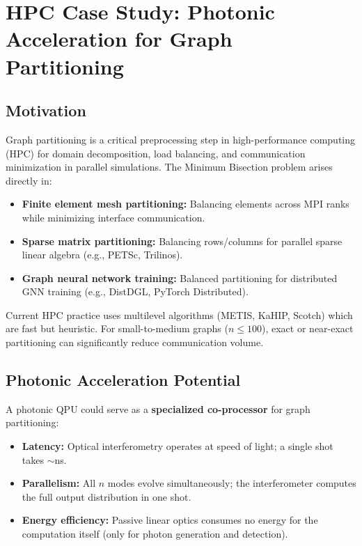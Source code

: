 \section{HPC Case Study: Photonic Acceleration for Graph Partitioning}
\label{sec:hpc}

\subsection{Motivation}

Graph partitioning is a critical preprocessing step in high-performance computing (HPC) for domain decomposition, load balancing, and communication minimization in parallel simulations. The Minimum Bisection problem arises directly in:
\begin{itemize}
\item \textbf{Finite element mesh partitioning:} Balancing elements across MPI ranks while minimizing interface communication.
\item \textbf{Sparse matrix partitioning:} Balancing rows/columns for parallel sparse linear algebra (e.g., PETSc, Trilinos).
\item \textbf{Graph neural network training:} Balanced partitioning for distributed GNN training (e.g., DistDGL, PyTorch Distributed).
\end{itemize}

Current HPC practice uses multilevel algorithms (METIS, KaHIP, Scotch) which are fast but heuristic. For small-to-medium graphs ($n \le 100$), exact or near-exact partitioning can significantly reduce communication volume.

\subsection{Photonic Acceleration Potential}

A photonic QPU could serve as a \textbf{specialized co-processor} for graph partitioning:
\begin{itemize}
\item \textbf{Latency:} Optical interferometry operates at speed of light; a single shot takes $\sim$ns.
\item \textbf{Parallelism:} All $n$ modes evolve simultaneously; the interferometer computes the full output distribution in one shot.
\item \textbf{Energy efficiency:} Passive linear optics consumes no energy for the computation itself (only for photon generation and detection).
\end{itemize}

